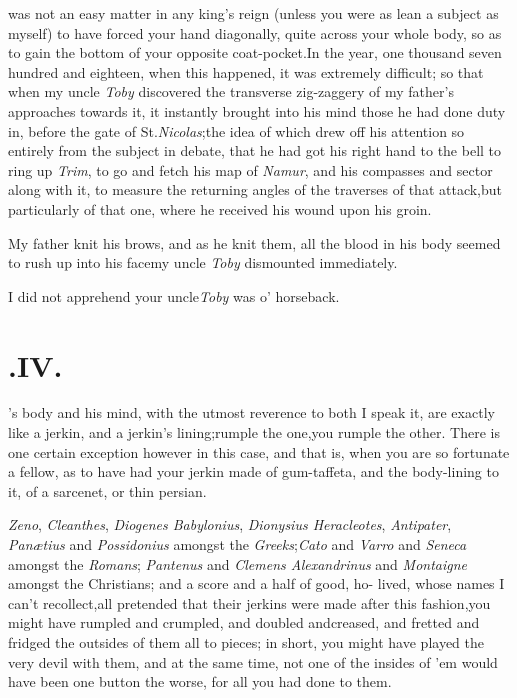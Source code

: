 \documentclass{article}
\begin{document}
 was not an easy matter in any
king’s reign (unless you were as lean a subject as myself) to
have forced your hand diagonally, quite across your whole body, so
as to gain the bottom of your opposite coat-pocket.\tsh In
the year, one thousand seven hundred and eighteen, when this
happened, it was extremely difficult; so that when my uncle
\textit{Toby} discovered the transverse zig-zaggery of my
father’s approaches towards it, it instantly brought into his
mind those he had done duty in, before the gate of
St.\@ \textit{Nicolas};\tsk the idea of which drew off his attention so
entirely from the subject in debate, that he had got his right
hand to the bell to ring up \textit{Trim}, to go and fetch
his map of \textit{Namur}, and his compasses and sector along with
it, to measure the returning angles of the traverses of that
attack,\tsk but particularly of that one, where he received his
wound upon his groin.

My father knit his brows, and as he knit them, all the blood in
his body seem\-ed to rush up into his face\tsh my uncle
\textit{Toby} dismounted immediately.

\tsk I did not apprehend your uncle\break \textit{Toby} was
o’ horseback.\tsh

\section{.\quad  IV.}

’s body and his mind, with
the utmost reverence to both I speak it, are exactly like a jerkin,
and a jerkin’s lining;\tsk rumple the one,\tsk you rumple
the other. There is one certain exception however in this case, and
that is, when you are so fortunate a fellow, as to have had your
jerkin made of gum-taffeta, and the body-lining to it, of a
sarcenet, or thin persian.

\textit{Zeno}, \textit{Cleanthes}, \textit{Diogenes Babylonius}, 
\textit{Dionysius Heracleotes}, \textit{Antipater}, \textit{Panætius} and
\textit{Possidonius} amongst the \textit{Greeks};\tsh \textit{Cato} and
\textit{Varro} and \textit{Seneca} amongst the \textit{Romans};\tsk
\textit{Pantenus} and \textit{Clemens Alexan\-drinus} and \textit{Montaigne} amongst
the Christians; and a score and a half of good, ho-\break
{}
lived, whose names I can’t recollect,\tsk all pretended that their
jerkins were made after this fashion,\tsk you might have rumpled and crumpled, and
doubled and\break creased, and fretted and fridged the outsides of them all to pieces;\tsk
in short, you might have played the very devil with them, and at the same time,
not
one of the insides of ’em would have been one button the worse, for all you had
done to them.
\end{document}
